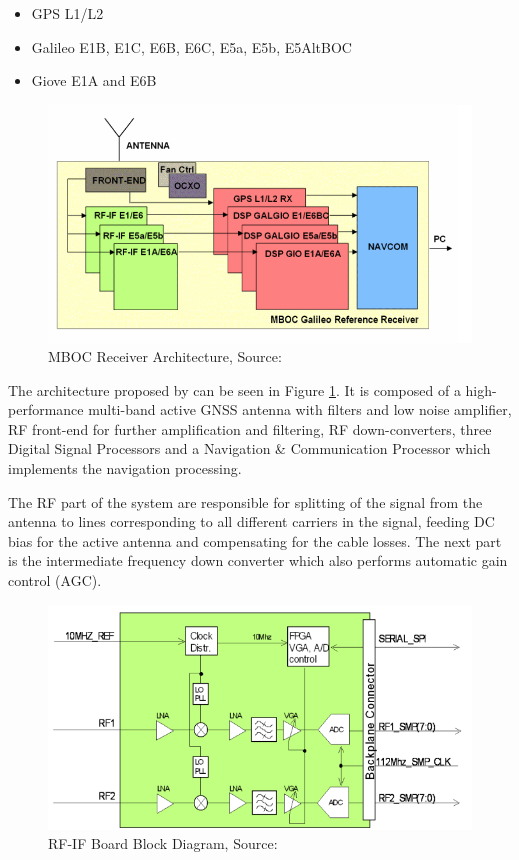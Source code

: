 \begin{itemize}
    \item GPS L1/L2
    \item Galileo E1B, E1C, E6B, E6C, E5a, E5b, E5AltBOC
    \item Giove E1A and E6B
\end{itemize}

\begin{figure}[h]
\centering
\includegraphics[width=\textwidth]{img/mboc_architecture}
\caption{MBOC Receiver Architecture, Source:\cite{ref_station_receiver}}
\label{fig:mboc_architecture}
\end{figure}

The architecture proposed by \cite{ref_station_receiver} can be seen in Figure \ref{fig:mboc_architecture}. It is composed of a high-performance multi-band active GNSS antenna with filters and low noise amplifier, RF front-end for further amplification and filtering, RF down-converters, three Digital Signal Processors and a Navigation \& Communication Processor which implements the navigation processing. 

The RF part of the system are responsible for splitting of the signal from the antenna to lines corresponding to all different carriers in the signal, feeding DC bias for the active antenna and compensating for the cable losses. The next part is the intermediate frequency down converter which also performs automatic gain control (AGC)\cite{ref_station_receiver}. 

\begin{figure}[h]
\centering
\includegraphics[width=\textwidth]{img/rf_if_block}
\caption{RF-IF Board Block Diagram, Source:\cite{ref_station_receiver}}
\label{fig:rf_if_block_diagram}
\end{figure}

